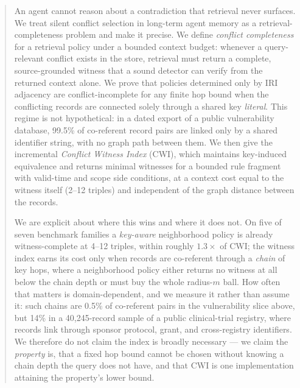 \begin{abstract}
An agent cannot reason about a contradiction that retrieval never surfaces. We treat silent conflict
selection in long-term agent memory as a retrieval-completeness problem and make it precise. We define
\emph{conflict completeness} for a retrieval policy under a bounded context budget: whenever a
query-relevant conflict exists in the store, retrieval must return a complete, source-grounded witness
that a sound detector can verify from the returned context alone. We prove that policies determined
only by IRI adjacency are conflict-incomplete for any finite hop bound when the conflicting records are
connected solely through a shared key \emph{literal}. This regime is not hypothetical: in a dated
export of a public vulnerability database, 99.5\% of co-referent record pairs are linked only by a
shared identifier string, with no graph path between them. We then give the incremental \emph{Conflict
Witness Index} (CWI), which maintains key-induced equivalence and returns minimal witnesses for a
bounded rule fragment with valid-time and scope side conditions, at a context cost equal to the witness
itself (2--12 triples) and independent of the graph distance between the records.

We are explicit about where this wins and where it does not. On five of seven benchmark families a
\emph{key-aware} neighborhood policy is already witness-complete at 4--12 triples, within roughly
$1.3\times$ of CWI; the witness index earns its cost only when records are co-referent through a
\emph{chain} of key hops, where a neighborhood policy either returns no witness at all below the chain
depth or must buy the whole radius-$m$ ball. How often that matters is domain-dependent, and we measure
it rather than assume it: such chains are 0.5\% of co-referent pairs in the vulnerability slice above,
but 14\% in a 40{,}245-record sample of a public clinical-trial registry, where records link through
sponsor protocol, grant, and cross-registry identifiers. We therefore do not claim the index is
broadly necessary --- we claim the \emph{property} is, that a fixed hop bound cannot be chosen without
knowing a chain depth the query does not have, and that CWI is one implementation attaining the
property's lower bound.


\end{abstract}
